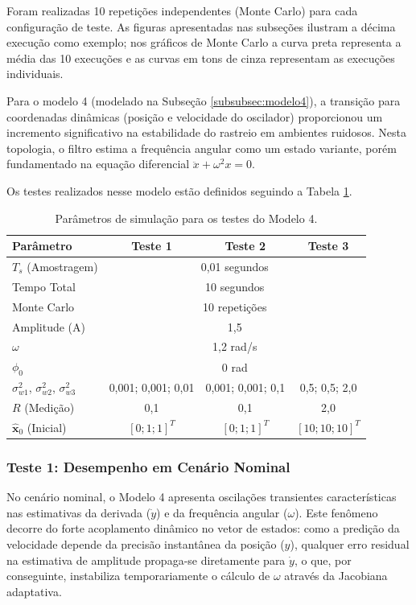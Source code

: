 \documentclass[a4paper,12pt]{article}
\begin{document}
Foram realizadas 10 repetições independentes (Monte Carlo) para cada configuração de teste. As figuras apresentadas nas subseções ilustram a décima execução como exemplo; nos gráficos de Monte Carlo a curva preta representa a média das 10 execuções e as curvas em tons de cinza representam as execuções individuais.

Para o modelo 4 (modelado na Subseção \ref{subsubsec:modelo4}), a transição para coordenadas dinâmicas (posição e velocidade do oscilador) proporcionou um incremento significativo na estabilidade do rastreio em ambientes ruidosos. Nesta topologia, o filtro estima a frequência angular como um estado variante, porém fundamentado na equação diferencial $\ddot{x} + \omega^2 x = 0$. 

Os testes realizados nesse modelo estão definidos seguindo a Tabela \ref{tab:parametros_m4}.

\begin{table}[H]
\centering
\caption{Parâmetros de simulação para os testes do Modelo 4.}
\label{tab:parametros_m4}
\begin{tabular}{l|c|c|c}
\hline
\textbf{Parâmetro} & \textbf{Teste 1} & \textbf{Teste 2} & \textbf{Teste 3} \\ \hline
$T_s$ (Amostragem) & \multicolumn{3}{c}{0,01 segundos} \\
Tempo Total & \multicolumn{3}{c}{10 segundos} \\ 
Monte Carlo & \multicolumn{3}{c}{10 repetições} \\ 
Amplitude (A) & \multicolumn{3}{c}{1,5} \\ 
$\omega$ & \multicolumn{3}{c}{1,2 rad/s} \\ 
$\phi_0$ & \multicolumn{3}{c}{0 rad} \\ \hline
$\sigma^2_{w1}$, $\sigma^2_{w2}$, $\sigma^2_{w3}$ & 0,001; 0,001; 0,01 & 0,001; 0,001; 0,1 & 0,5; 0,5; 2,0 \\ 
$R$ (Medição) & 0,1 & 0,1 & 2,0 \\ 
$\hat{\mathbf{x}}_0$ (Inicial) & $[0; 1; 1]^T$ & $[0; 1; 1]^T$ & $[10; 10; 10]^T$ \\ \hline
\end{tabular}
\end{table}

\subsubsection{Teste 1: Desempenho em Cenário Nominal}
\label{subsubsec:m4_teste1}

No cenário nominal, o Modelo 4 apresenta oscilações transientes características nas estimativas da derivada ($\dot{y}$) e da frequência angular ($\omega$). Este fenômeno decorre do forte acoplamento dinâmico no vetor de estados: como a predição da velocidade depende da precisão instantânea da posição ($y$), qualquer erro residual na estimativa de amplitude propaga-se diretamente para $\dot{y}$, o que, por conseguinte, instabiliza temporariamente o cálculo de $\omega$ através da Jacobiana adaptativa.
\end{document}
